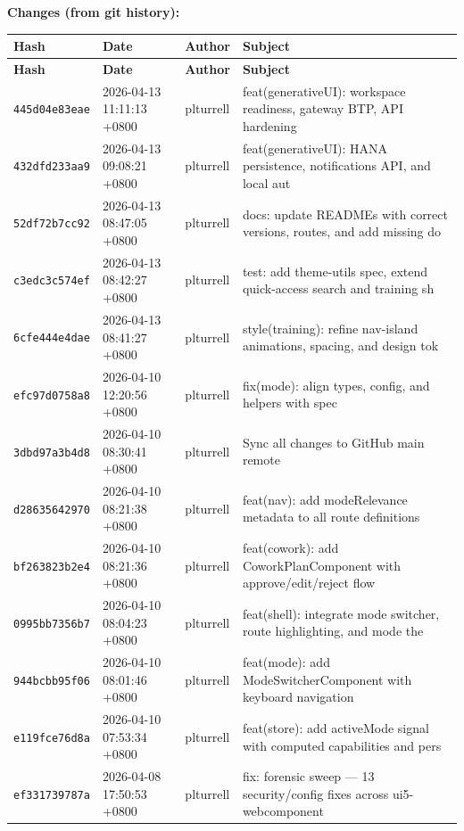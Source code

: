 \documentclass[11pt,a4paper]{article}
\begin{document}
\textbf{Changes (from git history):}
\begin{longtable}{|p{2.2cm}|p{3.2cm}|l|p{6cm}|}
\hline \textbf{Hash} & \textbf{Date} & \textbf{Author} & \textbf{Subject} \\ \hline \endfirsthead
\hline \textbf{Hash} & \textbf{Date} & \textbf{Author} & \textbf{Subject} \\ \hline \endhead
\texttt{445d04e83eae} & 2026-04-13 11:11:13 +0800 & plturrell & feat(generativeUI): workspace readiness, gateway BTP, API hardening \\
\texttt{432dfd233aa9} & 2026-04-13 09:08:21 +0800 & plturrell & feat(generativeUI): HANA persistence, notifications API, and local aut \\
\texttt{52df72b7cc92} & 2026-04-13 08:47:05 +0800 & plturrell & docs: update READMEs with correct versions, routes, and add missing do \\
\texttt{c3edc3c574ef} & 2026-04-13 08:42:27 +0800 & plturrell & test: add theme-utils spec, extend quick-access search and training sh \\
\texttt{6cfe444e4dae} & 2026-04-13 08:41:27 +0800 & plturrell & style(training): refine nav-island animations, spacing, and design tok \\
\texttt{efc97d0758a8} & 2026-04-10 12:20:56 +0800 & plturrell & fix(mode): align types, config, and helpers with spec \\
\texttt{3dbd97a3b4d8} & 2026-04-10 08:30:41 +0800 & plturrell & Sync all changes to GitHub main remote \\
\texttt{d28635642970} & 2026-04-10 08:21:38 +0800 & plturrell & feat(nav): add modeRelevance metadata to all route definitions \\
\texttt{bf263823b2e4} & 2026-04-10 08:21:36 +0800 & plturrell & feat(cowork): add CoworkPlanComponent with approve/edit/reject flow \\
\texttt{0995bb7356b7} & 2026-04-10 08:04:23 +0800 & plturrell & feat(shell): integrate mode switcher, route highlighting, and mode the \\
\texttt{944bcbb95f06} & 2026-04-10 08:01:46 +0800 & plturrell & feat(mode): add ModeSwitcherComponent with keyboard navigation \\
\texttt{e119fce76d8a} & 2026-04-10 07:53:34 +0800 & plturrell & feat(store): add activeMode signal with computed capabilities and pers \\
\texttt{ef331739787a} & 2026-04-08 17:50:53 +0800 & plturrell & fix: forensic sweep — 13 security/config fixes across ui5-webcomponent \\

\end{longtable}
\end{document}
